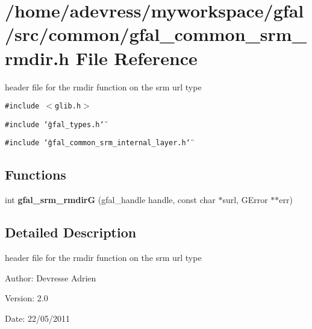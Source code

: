 \section{/home/adevress/myworkspace/gfal/src/common/gfal\_\-common\_\-srm\_\-rmdir.h File Reference}
\label{gfal__common__srm__rmdir_8h}
header file for the rmdir function on the srm url type 

{\tt \#include $<$glib.h$>$}\par
{\tt \#include \char`\"{}gfal\_\-types.h\char`\"{}}\par
{\tt \#include \char`\"{}gfal\_\-common\_\-srm\_\-internal\_\-layer.h\char`\"{}}\par
\subsection*{Functions}
\begin{CompactItemize}
\item 
int \textbf{gfal\_\-srm\_\-rmdir\-G} (gfal\_\-handle handle, const char $\ast$surl, GError $\ast$$\ast$err)\label{gfal__common__srm__rmdir_8h_4c8ec8a7f1716aa19a83fc94dda6b08e}

\end{CompactItemize}


\subsection{Detailed Description}
header file for the rmdir function on the srm url type 

\begin{Desc}
\item[Author:]Devresse Adrien \end{Desc}
\begin{Desc}
\item[Version:]2.0 \end{Desc}
\begin{Desc}
\item[Date:]22/05/2011 \end{Desc}
